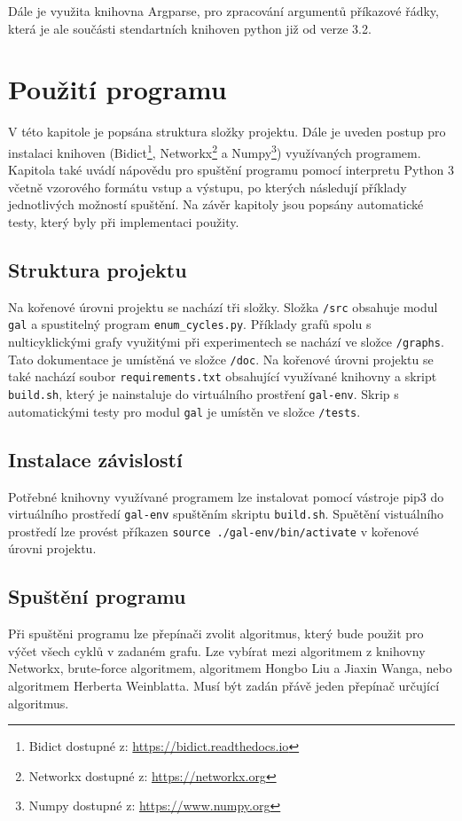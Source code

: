         Dále je využita knihovna Argparse, pro zpracování argumentů příkazové řádky, která je ale součásti stendartních knihoven python již od verze 3.2.

\chapter{Použití programu}
    \label{chapter:Help}
    V této kapitole je popsána struktura složky projektu. Dále je uveden postup pro instalaci knihoven (Bidict\footnote{Bidict dostupné z: \url{https://bidict.readthedocs.io}}, Networkx\footnote{Networkx dostupné z: \url{https://networkx.org}} a Numpy\footnote{Numpy dostupné z: \url{https://www.numpy.org}}) využívaných programem. Kapitola také uvádí nápovědu pro spuštění programu pomocí interpretu Python 3 včetně vzorového formátu vstup a výstupu, po kterých následují příklady jednotlivých možností spuštění. Na závěr kapitoly jsou popsány automatické testy, který byly při implementaci použity.

    \section{Struktura projektu}
        Na kořenové úrovni projektu se nachází tři složky. Složka \texttt{/src} obsahuje modul \texttt{gal} a spustitelný program \texttt{enum\_cycles.py}. Příklady grafů spolu s nulticyklickými grafy využitými při experimentech se nachází ve složce \texttt{/graphs}. Tato dokumentace je umístěná ve složce \texttt{/doc}. Na kořenové úrovni projektu se také nachází soubor \texttt{requirements.txt} obsahující využívané knihovny a skript \texttt{build.sh}, který je nainstaluje do virtuálního prostření \texttt{gal-env}. Skrip s automatickými testy pro modul \texttt{gal} je umístěn ve složce \texttt{/tests}.

    \section{Instalace závislostí}
        Potřebné knihovny využívané programem lze instalovat pomocí vástroje pip3 do virtuálního prostředí \texttt{gal-env} spuštěním skriptu \texttt{build.sh}. Spuětění vistuálního prostředí lze provést příkazen \texttt{source ./gal-env/bin/activate} v kořenové úrovni projektu.

    \section{Spuštění programu}
        Při spuštěni programu lze přepínači zvolit algoritmus, který bude použit pro výčet všech cyklů v zadaném grafu. Lze vybírat mezi algoritmem z knihovny Networkx, brute-force algoritmem, algoritmem Hongbo Liu a Jiaxin Wanga, nebo algoritmem Herberta Weinblatta. Musí být zadán přávě jeden přepínač určující algoritmus.

